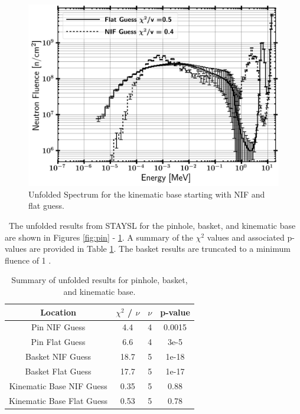 \documentclass[journal]{IEEEtran}
\let\MYoriglatexcaption\caption
\renewcommand{\caption}[2][\relax]{\MYoriglatexcaption[#2]{#2}}
\begin{document}
{\begin{figure}[t!]
		\label{fig:bask}
		\vskip 0.9cm
		\includegraphics[width=\linewidth]{Figures/KBASBothLog.png}
		\caption{Unfolded Spectrum for the kinematic base starting with NIF and flat guess.}
		\label{fig:kbas}
		
	\end{figure}
	\ The unfolded results from STAYSL for the pinhole, basket, and kinematic base are shown in Figures \ref{fig:pin} - \ref{fig:kbas}. 
A summary of the $\chi^{2}$ values and associated p-values are provided in Table \ref{Table:STAY}. 
The basket results are truncated to a minimum fluence of 1 . 
	
	\begin{table}[h]
		\caption{Summary of unfolded results for pinhole, basket, and kinematic base.}
		\label{Table:STAY}
		\centering
		\begin{tabular}{|c|c|c|c|}
			\hline
			Location & $\chi^{2}$ / $\nu$ & $\nu$ & p-value \\ \hline
			Pin NIF Guess & 4.4 & 4 & 0.0015 \\ \hline
			Pin Flat Guess & 6.6 & 4 & 3e-5 \\ \hline
			Basket NIF Guess & 18.7 & 5 & 1e-18 \\ \hline
			Basket Flat Guess & 17.7 & 5 & 1e-17 \\ \hline
			Kinematic Base NIF Guess & 0.35 & 5 & 0.88 \\ \hline
			Kinematic Base Flat Guess & 0.53 & 5 & 0.78 \\ \hline
		\end{tabular}
	\end{table}
	
}
\end{document}

